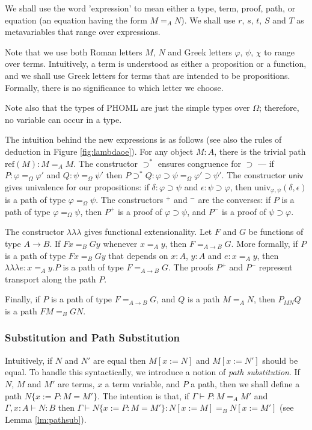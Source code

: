 \documentclass[a4paper,UKenglish]{lipics-v2016}
\newcommand*{\reff}[1]{\ensuremath{\mathrm{ref} \left( {#1} \right)}}
\newcommand*{\univ}[4]{\ensuremath{\mathrm{univ}_{{#1}, {#2}} \left({#3} , {#4} \right)}}
\newcommand*{\triplelambda}{\ensuremath{\lambda \!\! \lambda \!\! \lambda}}
\theoremstyle{plain}
\theoremstyle{definition}
\begin{document}
We shall use the word 'expression' to mean either a type, term, proof, path, or equation (an equation having the form $M =_A N$).  We shall use $r$, $s$, $t$, $S$ and $T$ as metavariables that range over expressions.

Note that we use both Roman letters $M$, $N$ and Greek letters $\varphi$, $\psi$, $\chi$ to range over terms.  Intuitively, a term is understood as either a proposition or a function,
and we shall use Greek letters for terms that are intended to be propositions.  Formally, there is no significance to which letter we choose.

Note also that the types of PHOML are just the simple types over $\Omega$; therefore, no variable can occur in a type.

The intuition behind the new expressions is as follows (see also the rules of deduction in Figure \ref{fig:lambdaoe}).  For any object $M : A$, there is the trivial path $\reff{M} : M =_A M$.  The constructor $\supset^*$ ensures congruence for $\supset$ --- if $P : \varphi =_\Omega \varphi'$ and $Q : \psi =_\Omega \psi'$ then $P \supset^* Q : \varphi \supset \psi =_\Omega \varphi' \supset \psi'$.  The constructor $\mathsf{univ}$ gives univalence for our propositions: if $\delta : \varphi \supset \psi$ and $\epsilon : \psi \supset \varphi$, then $\univ{\varphi}{\psi}{\delta}{\epsilon}$ is a path of type $\varphi =_\Omega \psi$.  The constructors $^+$ and $^-$ are the converses: if $P$ is a path of type $\varphi =_\Omega \psi$, then $P^+$ is a proof of $\varphi \supset \psi$, and $P^-$ is a proof of $\psi \supset \varphi$.

The constructor $\triplelambda$ gives functional extensionality.  Let $F$ and $G$ be functions of type $A \rightarrow B$.  If $F x =_B G y$ whenever $x =_A y$, then $F =_{A \rightarrow B} G$.  More formally, if $P$ is a path of type $Fx =_B Gy$ that depends on $x : A$, $y : A$ and $e : x =_A y$, then $\triplelambda e : x =_A y . P$ is a path of type $F =_{A \rightarrow B} G$.  The proofs $P^+$ and $P^-$ represent transport along the path $P$.

Finally, if $P$ is a path of type $F =_{A \rightarrow B} G$, and $Q$ is a path $M =_A N$, then $P_{MN} Q$ is a path $FM =_B G N$.

\subsubsection{Substitution and Path Substitution}

Intuitively, if $N$ and $N'$ are equal then $M[x:=N]$ and $M[x:=N']$ should be equal.  To handle this syntactically,
we introduce a notion of \emph{path substitution}.  If $N$, $M$ and $M'$ are terms, $x$ a term variable, and $P$ a path, then we shall define a path $N \{ x := P : M = M' \}$.  The intention is that, if
$\Gamma \vdash P : M =_A M'$ and $\Gamma, x : A \vdash N : B$ then $\Gamma \vdash N \{ x := P : M = M' \} : N [ x:= M ] =_B N [ x := M' ]$ (see Lemma \ref{lm:pathsub}). 
\end{document}
